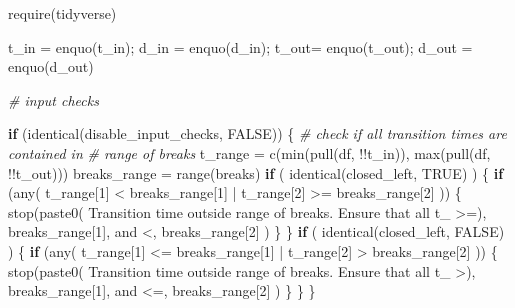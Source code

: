 \documentclass[10pt, twoside]{article}
\newenvironment{Shaded}{}{}
\newcommand{\CommentTok}[1]{\textit{#1}}
\newcommand{\ConstantTok}[1]{#1}
\newcommand{\ControlFlowTok}[1]{\textbf{#1}}
\newcommand{\DecValTok}[1]{#1}
\newcommand{\FunctionTok}[1]{#1}
\newcommand{\NormalTok}[1]{#1}
\newcommand{\OtherTok}[1]{#1}
\newcommand{\SpecialCharTok}[1]{#1}
\newcommand{\StringTok}[1]{#1}
\begin{document}
\begin{Shaded}
\begin{Highlighting}[]
  \FunctionTok{require}\NormalTok{(tidyverse)}

\NormalTok{  t\_in }\OtherTok{=} \FunctionTok{enquo}\NormalTok{(t\_in); d\_in }\OtherTok{=} \FunctionTok{enquo}\NormalTok{(d\_in);}
\NormalTok{  t\_out}\OtherTok{=} \FunctionTok{enquo}\NormalTok{(t\_out); d\_out }\OtherTok{=} \FunctionTok{enquo}\NormalTok{(d\_out)}

  \CommentTok{\# input checks}

  \ControlFlowTok{if}\NormalTok{ (}\FunctionTok{identical}\NormalTok{(disable\_input\_checks, }\ConstantTok{FALSE}\NormalTok{)) \{}
    \CommentTok{\# check if all transition times are contained in}
    \CommentTok{\# range of breaks}
\NormalTok{    t\_range }\OtherTok{=} \FunctionTok{c}\NormalTok{(}\FunctionTok{min}\NormalTok{(}\FunctionTok{pull}\NormalTok{(df, }\SpecialCharTok{!!}\NormalTok{t\_in)), }\FunctionTok{max}\NormalTok{(}\FunctionTok{pull}\NormalTok{(df, }\SpecialCharTok{!!}\NormalTok{t\_out)))}
\NormalTok{    breaks\_range }\OtherTok{=} \FunctionTok{range}\NormalTok{(breaks)}
    \ControlFlowTok{if}\NormalTok{ ( }\FunctionTok{identical}\NormalTok{(closed\_left, }\ConstantTok{TRUE}\NormalTok{) ) \{}
      \ControlFlowTok{if}\NormalTok{ (}\FunctionTok{any}\NormalTok{(}
\NormalTok{        t\_range[}\DecValTok{1}\NormalTok{] }\SpecialCharTok{\textless{}}\NormalTok{ breaks\_range[}\DecValTok{1}\NormalTok{] }\SpecialCharTok{|}
\NormalTok{        t\_range[}\DecValTok{2}\NormalTok{] }\SpecialCharTok{\textgreater{}=}\NormalTok{ breaks\_range[}\DecValTok{2}\NormalTok{]}
\NormalTok{      )) \{}
        \FunctionTok{stop}\NormalTok{(}\FunctionTok{paste0}\NormalTok{(}
          \StringTok{\textquotesingle{}Transition time outside range of breaks. Ensure that all t\_ \textgreater{}=\textquotesingle{}}\NormalTok{),}
\NormalTok{          breaks\_range[}\DecValTok{1}\NormalTok{], }\StringTok{\textquotesingle{} and \textless{}\textquotesingle{}}\NormalTok{, breaks\_range[}\DecValTok{2}\NormalTok{]}
\NormalTok{        )}
\NormalTok{      \}}
\NormalTok{    \}}
    \ControlFlowTok{if}\NormalTok{ ( }\FunctionTok{identical}\NormalTok{(closed\_left, }\ConstantTok{FALSE}\NormalTok{) ) \{}
      \ControlFlowTok{if}\NormalTok{ (}\FunctionTok{any}\NormalTok{(}
\NormalTok{        t\_range[}\DecValTok{1}\NormalTok{] }\SpecialCharTok{\textless{}=}\NormalTok{ breaks\_range[}\DecValTok{1}\NormalTok{] }\SpecialCharTok{|}
\NormalTok{        t\_range[}\DecValTok{2}\NormalTok{] }\SpecialCharTok{\textgreater{}}\NormalTok{ breaks\_range[}\DecValTok{2}\NormalTok{]}
\NormalTok{      )) \{}
        \FunctionTok{stop}\NormalTok{(}\FunctionTok{paste0}\NormalTok{(}
          \StringTok{\textquotesingle{}Transition time outside range of breaks. Ensure that all t\_ \textgreater{}\textquotesingle{}}\NormalTok{),}
\NormalTok{          breaks\_range[}\DecValTok{1}\NormalTok{], }\StringTok{\textquotesingle{} and \textless{}=\textquotesingle{}}\NormalTok{, breaks\_range[}\DecValTok{2}\NormalTok{]}
\NormalTok{        )}
\NormalTok{      \}}
\NormalTok{    \}}
\NormalTok{  \}}


\end{Highlighting}
\end{Shaded}
\end{document}

